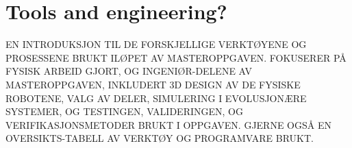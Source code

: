 \section*{Tools and engineering?}
	EN INTRODUKSJON TIL DE FORSKJELLIGE VERKTØYENE OG PROSESSENE BRUKT ILØPET AV MASTEROPPGAVEN. FOKUSERER PÅ FYSISK ARBEID GJORT, OG INGENIØR-DELENE AV MASTEROPPGAVEN, INKLUDERT 3D DESIGN AV DE FYSISKE ROBOTENE, VALG AV DELER, SIMULERING I EVOLUSJONÆRE SYSTEMER, OG TESTINGEN, VALIDERINGEN, OG VERIFIKASJONSMETODER BRUKT I OPPGAVEN. GJERNE OGSÅ EN OVERSIKTS-TABELL AV VERKTØY OG PROGRAMVARE BRUKT.
